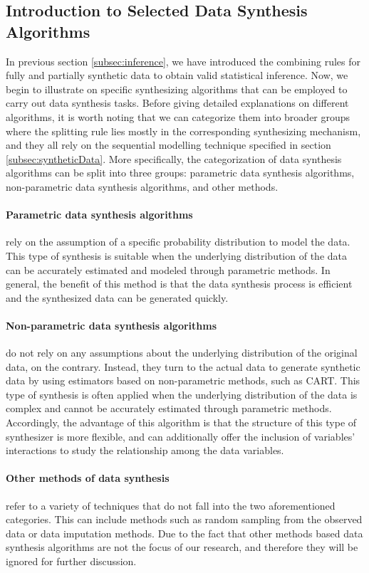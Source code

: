 \subsection{Introduction to Selected Data Synthesis Algorithms}
\label{subsec:detailsynmethods}
In previous section \ref{subsec:inference}, we have introduced the combining rules for fully and partially synthetic data to obtain valid statistical inference. Now, we begin to illustrate on specific synthesizing algorithms that can be employed to carry out data synthesis tasks. Before giving detailed explanations on different algorithms, it is worth noting that we can categorize them into broader groups where the splitting rule lies mostly in the corresponding synthesizing mechanism, and they all rely on the sequential modelling technique specified in section \ref{subsec:syntheticData}. More specifically, the categorization of data synthesis algorithms can be split into three groups: parametric data synthesis algorithms, non-parametric data synthesis algorithms, and other methods.

\paragraph{Parametric data synthesis algorithms}rely on the assumption of a specific probability distribution to model the data. This type of synthesis is suitable when the underlying distribution of the data can be accurately estimated and modeled through parametric methods. In general, the benefit of this method is that the data synthesis process is efficient and the synthesized data can be generated quickly.

\paragraph{Non-parametric data synthesis algorithms}do not rely on any assumptions about the underlying distribution of the original data, on the contrary. Instead, they turn to the actual data to generate synthetic data by using estimators based on non-parametric methods, such as CART. This type of synthesis is often applied when the underlying distribution of the data is complex and cannot be accurately estimated through parametric methods. Accordingly, the advantage of this algorithm is that the structure of this type of synthesizer is more flexible, and can additionally offer the inclusion of variables' interactions to study the relationship among the data variables.

\paragraph{Other methods of data synthesis}refer to a variety of techniques that do not fall into the two aforementioned categories. This can include methods such as random sampling from the observed data or data imputation methods. Due to the fact that other methods based data synthesis algorithms are not the focus of our research, and therefore they will be ignored for further discussion.

